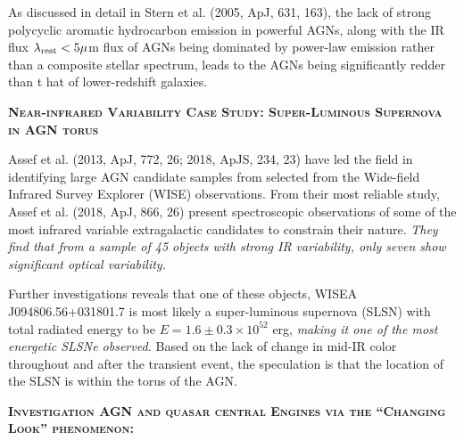 \documentclass[12pt]{article}
\begin{document}
\smallskip
\smallskip
\noindent
As discussed in detail in Stern et al. (2005, ApJ, 631, 163), the lack of strong polycyclic aromatic hydrocarbon emission in powerful AGNs, along with the IR flux $\lambda_{\rm rest} < 5 \mu$m flux of AGNs being dominated by power-law emission rather than a composite stellar spectrum, leads to the  AGNs being significantly redder than t
hat of lower-redshift galaxies. 

\smallskip
\smallskip
\noindent
\textbf{\textsc{Near-infrared Variability Case Study: Super-Luminous Supernova in AGN torus}} 

\smallskip
\smallskip
\noindent
Assef et al. (2013, ApJ, 772, 26; 2018, ApJS, 234, 23) have led the field in identifying large AGN candidate samples from selected from the Wide-field Infrared Survey Explorer (WISE) observations. 
From their most reliable study, Assef et al. (2018, ApJ, 866, 26) present spectroscopic observations of some of the most infrared variable extragalactic candidates to constrain their nature. {\it They find that from a sample of 45 objects with strong IR variability, only seven show significant optical variability.}  

\smallskip
\smallskip
\noindent
Further investigations reveals that one of these objects, WISEA J094806.56+031801.7  is most likely a super-luminous supernova (SLSN) with total radiated energy to be $E=1.6\pm0.3 \times 10^{52}$ erg, {\it making it one of the most energetic SLSNe observed.} Based on the lack of change in mid-IR color throughout and after the transient event, the speculation is that the location of the SLSN is within the torus of the AGN. 


\smallskip
\smallskip
\noindent
\textbf{\textsc{Investigation AGN and quasar central Engines via the ``Changing Look'' phenomenon:}}
\end{document}
